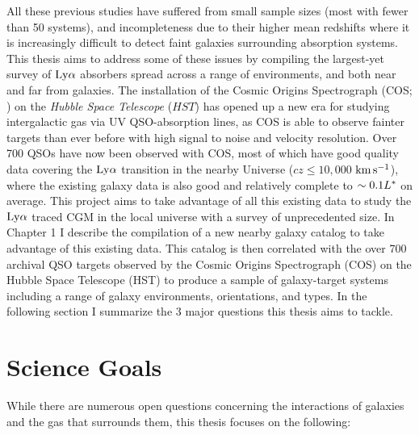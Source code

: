 \documentclass[twocolumn,tighten]{aastex62}
\newcommand{\kms}{$\rm km\, s^{-1}$}
\begin{document}
All these previous studies have suffered from small sample sizes (most with fewer than 50 systems), and incompleteness due to their higher mean redshifts where it is increasingly difficult to detect faint galaxies surrounding absorption systems. This thesis aims to address some of these issues by compiling the largest-yet survey of $\rm Ly\alpha$ absorbers spread across a range of environments, and both near and far from galaxies. The installation of the Cosmic Origins Spectrograph (COS; \citealt{green2012}) on the \emph{Hubble Space Telescope} ($HST$) has opened up a new era for studying intergalactic gas via UV QSO-absorption lines, as COS is able to observe fainter targets than ever before with high signal to noise and velocity resolution. Over 700 QSOs have now been observed with COS, most of which have good quality data covering the $\rm Ly\alpha$ transition in the nearby Universe ($cz \leq 10,000$ \kms), where the existing galaxy data is also good and relatively complete to $\sim 0.1 L^{\**}$ on average. This project aims to take advantage of all this existing data to study the $\rm Ly\alpha$ traced CGM in the local universe with a survey of unprecedented size. In Chapter 1 I describe the compilation of a new nearby galaxy catalog to take advantage of this existing data. This catalog is then correlated with the over 700 archival QSO targets observed by the Cosmic Origins Spectrograph (COS) on the Hubble Space Telescope (HST) to produce a sample of galaxy-target systems including a range of galaxy environments, orientations, and types. In the following section I summarize the 3 major questions this thesis aims to tackle.





\section{Science Goals}
While there are numerous open questions concerning the interactions of galaxies and the gas that surrounds them, this thesis focuses on the following:

\end{document}
